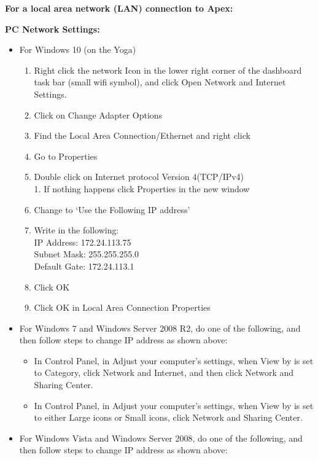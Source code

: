 \documentclass[
]{book}
\providecommand{\tightlist}{%
  \setlength{\itemsep}{0pt}\setlength{\parskip}{0pt}}
\begin{document}
\textbf{For a local area network (LAN) connection to Apex:}

\textbf{PC Network Settings:}

\begin{itemize}
\tightlist
\item
  For Windows 10 (on the Yoga)

  \begin{enumerate}
  \def\labelenumi{\arabic{enumi}.}
  \tightlist
  \item
    Right click the network Icon in the lower right corner of the dashboard task bar (small wifi symbol), and click Open Network and Internet Settings.\\
  \item
    Click on Change Adapter Options\\
  \item
    Find the Local Area Connection/Ethernet and right click\\
  \item
    Go to Properties\\
  \item
    Double click on Internet protocol Version 4(TCP/IPv4)\\
    1. If nothing happens click Properties in the new window\\
  \item
    Change to `Use the Following IP address'\\
  \item
    Write in the following:\\
    IP Address: 172.24.113.75\\
    Subnet Mask: 255.255.255.0\\
    Default Gate: 172.24.113.1\\
  \item
    Click OK\\
  \item
    Click OK in Local Area Connection Properties
  \end{enumerate}
\item
  For Windows 7 and Windows Server 2008 R2, do one of the following, and then follow steps to change IP address as shown above:

  \begin{itemize}
  \tightlist
  \item
    In Control Panel, in Adjust your computer's settings, when View by is set to Category, click Network and Internet, and then click Network and Sharing Center.\\
  \item
    In Control Panel, in Adjust your computer's settings, when View by is set to either Large icons or Small icons, click Network and Sharing Center.
  \end{itemize}
\item
  For Windows Vista and Windows Server 2008, do one of the following, and then follow steps to change IP address as shown above:


\end{itemize}
\end{document}
